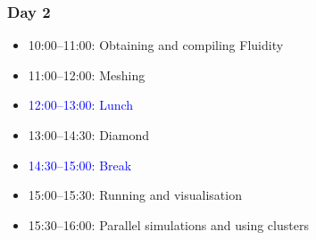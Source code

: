 
\begin{frame}
  \frametitle{Day 2}
  \begin{itemize}[]
  \item[] 10:00--11:00: Obtaining and compiling Fluidity
  \item[] 11:00--12:00: Meshing
  \item[] \textcolor{blue}{12:00--13:00: Lunch}
  \item[] 13:00--14:30: Diamond
  \item[] \textcolor{blue}{14:30--15:00: Break}
  \item[] 15:00--15:30: Running and visualisation
  \item[] 15:30--16:00: Parallel simulations and using clusters
  \end{itemize}
\end{frame}
